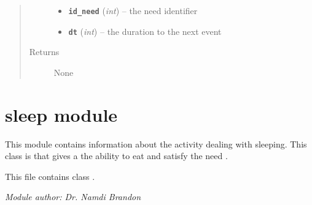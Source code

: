 \documentclass[letterpaper,10pt,english]{sphinxmanual}
\begin{document}
\begin{fulllineitems}
\begin{fulllineitems}
\begin{quote}
\begin{description}
\begin{itemize}
\item {} 
\textbf{\texttt{id\_need}} (\emph{int}) -- the need identifier

\item {} 
\textbf{\texttt{dt}} (\emph{int}) -- the duration to the next event

\end{itemize}

\item[{Returns}] \leavevmode
None

\end{description}\end{quote}

\end{fulllineitems}


\end{fulllineitems}



\section{sleep module}
\label{sleep::doc}\label{sleep:module-sleep}\label{sleep:sleep-module}
This module contains information about the activity dealing with sleeping. This class is {\hyperref[activity:activity.Activity]{\emph{}}} that gives a {\hyperref[person:person.Person]{\emph{}}} the ability to eat and satisfy the need {\hyperref[rest:rest.Rest]{\emph{}}}.

This file contains class {\hyperref[sleep:sleep.Sleep]{\emph{}}}.

\emph{Module author: Dr. Namdi Brandon}
\end{document}
